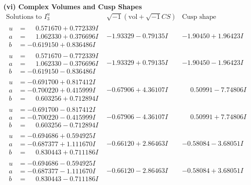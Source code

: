 \documentclass[1p]{elsarticle_modified}
\theoremstyle{definition}
\newcommand{\I}{\sqrt{-1}}
\begin{document}
\newpage\flushleft \textbf{(vi) Complex Volumes and Cusp Shapes}
$$\begin{array}{c|c|c}  
\text{Solutions to }I^u_{3}& \I (\text{vol} + \sqrt{-1}CS) & \text{Cusp shape}\\
 \hline 
\begin{aligned}
u &= \phantom{-}0.571670 + 0.772339 I \\
a &= \phantom{-}1.062330 + 0.376696 I \\
b &= -0.619150 + 0.836486 I\end{aligned}
 & -1.93329 - 0.79135 I & -1.90450 + 1.96423 I \\ \hline\begin{aligned}
u &= \phantom{-}0.571670 - 0.772339 I \\
a &= \phantom{-}1.062330 - 0.376696 I \\
b &= -0.619150 - 0.836486 I\end{aligned}
 & -1.93329 + 0.79135 I & -1.90450 - 1.96423 I \\ \hline\begin{aligned}
u &= -0.691700 + 0.817412 I \\
a &= -0.700220 + 0.415999 I \\
b &= \phantom{-}0.603256 + 0.712894 I\end{aligned}
 & -0.67906 + 4.36107 I & \phantom{-}0.50991 - 7.74806 I \\ \hline\begin{aligned}
u &= -0.691700 - 0.817412 I \\
a &= -0.700220 - 0.415999 I \\
b &= \phantom{-}0.603256 - 0.712894 I\end{aligned}
 & -0.67906 - 4.36107 I & \phantom{-}0.50991 + 7.74806 I \\ \hline\begin{aligned}
u &= -0.694686 + 0.594925 I \\
a &= -0.687377 + 1.111670 I \\
b &= \phantom{-}0.830443 + 0.711186 I\end{aligned}
 & -0.66120 + 2.86463 I & -0.58084 - 3.68051 I \\ \hline\begin{aligned}
u &= -0.694686 - 0.594925 I \\
a &= -0.687377 - 1.111670 I \\
b &= \phantom{-}0.830443 - 0.711186 I\end{aligned}
 & -0.66120 - 2.86463 I & -0.58084 + 3.68051 I \\ \hline\begin{aligned}

\end{aligned}
\end{array}$$
\end{document}

